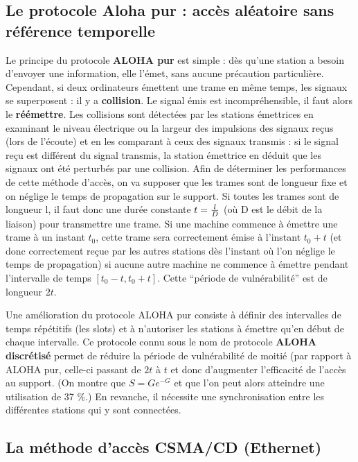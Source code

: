 \documentclass[11pt,english,french]{scrreprt}
\theoremstyle{remark}
\theoremstyle{definition}
\begin{document}
\subsection{Le protocole Aloha pur : accès aléatoire sans référence temporelle} %

Le principe du protocole \textbf{ALOHA pur} est simple : dès qu'une station a besoin d'envoyer une information, elle l'émet, sans aucune précaution particulière. Cependant, si deux ordinateurs émettent une trame en même temps, les signaux se superposent : il y a \textbf{collision}. Le signal émis est incompréhensible, il faut alors le \textbf{réémettre}. Les collisions sont détectées par les stations émettrices en examinant le niveau électrique ou la largeur des impulsions des signaux reçus (lors de l’écoute) et en les comparant à ceux des signaux transmis : si le signal reçu est différent du signal transmis, la station émettrice en déduit que les signaux ont été perturbés par une collision. Afin de déterminer les performances de cette méthode d’accès, on va supposer que les trames sont de longueur fixe et on néglige le temps de propagation sur le support. Si toutes les trames sont de longueur l, il faut donc une durée constante $t = {l \over D}$ (où D est le débit de la liaison) pour transmettre une trame. Si une machine commence à émettre une trame à un instant $t_0$, cette trame sera correctement émise à l’instant $t_0 + t$ (et donc correctement reçue par les autres stations dès l’instant où l’on néglige le temps de propagation) si aucune autre machine ne commence à émettre pendant l’intervalle de temps $[t_0 - t, t_0 + t]$. Cette “période de vulnérabilité” est de longueur $2t$.

Une amélioration du protocole ALOHA pur consiste à définir des intervalles de temps répétitifs (les slots) et à n’autoriser les stations à émettre qu’en début de chaque intervalle. Ce protocole connu sous le nom de protocole \textbf{ALOHA discrétisé} permet de réduire la période de vulnérabilité de moitié (par rapport à ALOHA pur, celle-ci passant de $2t$ à $t$ et donc d’augmenter l’efficacité de l’accès au support. (On montre que $S = G e^{-G}$ et que l’on peut alors atteindre une utilisation de 37 \%.) En revanche, il nécessite une synchronisation entre les différentes stations qui y sont connectées.

\subsection{La méthode d'accès CSMA/CD (Ethernet)} %
\end{document}
